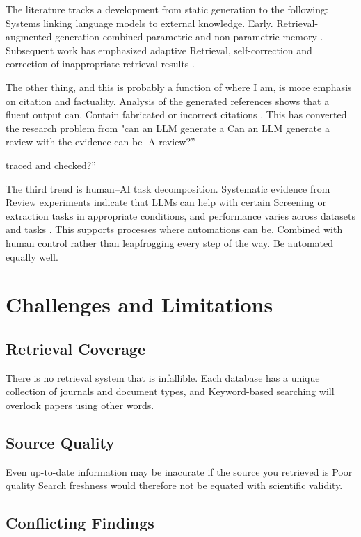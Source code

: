 \documentclass[acmsmall,screen]{acmart}
\begin{document}
The literature tracks a development from static generation to the following:
Systems linking language models to external knowledge. Early.
Retrieval-augmented generation combined parametric and non-parametric
memory \cite{lewis2020rag}. Subsequent work has emphasized adaptive
Retrieval, self-correction and correction of inappropriate retrieval results
\cite{asai2024selfrag, yan2024crag}.

The other thing, and this is probably a function of where I am, is more emphasis on citation and factuality.
Analysis of the generated references shows that a fluent output can.
Contain fabricated or incorrect citations \cite{walters2023,chelli2024}.
This has converted the research problem from "can an LLM generate a
Can an LLM generate a review with the evidence can be A review?''

traced and checked?''

The third trend is human--AI task decomposition. Systematic evidence from
Review experiments indicate that LLMs can help with certain
Screening or extraction tasks in appropriate conditions, and
performance varies across datasets and tasks
\cite{khraisha2024}. This supports processes where automations can be.
Combined with human control rather than leapfrogging every step of the way.
Be automated equally well.

\section{Challenges and Limitations}

\subsection{Retrieval Coverage}

There is no retrieval system that is infallible.
Each database has a unique collection of journals and document types, and
Keyword-based searching will overlook papers using other words.

\subsection{Source Quality}

Even up-to-date information may be inacurate if the source you retrieved is
Poor quality Search freshness would therefore not be equated with
scientific validity.

\subsection{Conflicting Findings}
\end{document}
